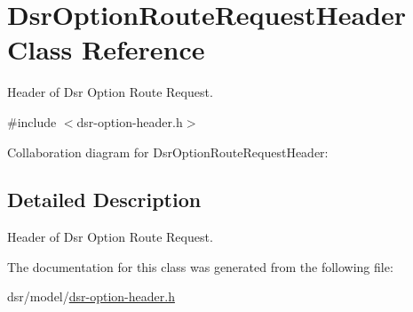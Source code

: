 \hypertarget{classDsrOptionRouteRequestHeader}{}\section{Dsr\+Option\+Route\+Request\+Header Class Reference}
\label{classDsrOptionRouteRequestHeader}


Header of Dsr Option Route Request.  




{\ttfamily \#include $<$dsr-\/option-\/header.\+h$>$}



Collaboration diagram for Dsr\+Option\+Route\+Request\+Header\+:


\subsection{Detailed Description}
Header of Dsr Option Route Request. 

The documentation for this class was generated from the following file\+:\begin{DoxyCompactItemize}
\item 
dsr/model/\hyperlink{dsr-option-header_8h}{dsr-\/option-\/header.\+h}\end{DoxyCompactItemize}
